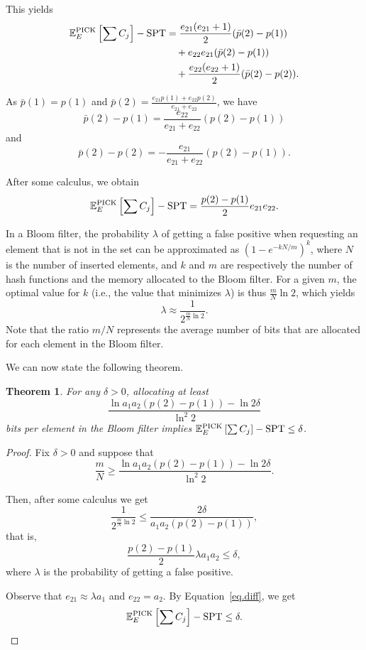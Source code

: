 \documentclass{article}
\newtheorem{theorem}{Theorem}
\begin{document}
This yields
\begin{align*}
    \mathbb{E}_E^{\text{PICK}}\left[\sum C_j\right]-\text{SPT}
    &=\frac{e_{21}(e_{21}+1)}{2}(\bar{p}(2)-p(1)) \\
    &\quad+e_{22}e_{21}(\bar{p}(2)-p(1)) \\
    &\quad+\frac{e_{22}(e_{22}+1)}{2}(\bar{p}(2)-p(2)).
\end{align*}

As \(\bar{p}(1)=p(1)\) and \(\bar{p}(2)=\frac{e_{21}p(1)+e_{22}p(2)}{e_{21}+e_{22}}\), we have
\[
    \bar{p}(2)-p(1)=\frac{e_{22}}{e_{21}+e_{22}}(p(2)-p(1))
\]
and
\[
    \bar{p}(2)-p(2)=-\frac{e_{21}}{e_{21}+e_{22}}(p(2)-p(1)).
\]

After some calculus, we obtain
\begin{equation}
    \label{eq.diff}
    \mathbb{E}_E^{\text{PICK}}\left[\sum C_j\right]-\text{SPT}=\frac{p(2)-p(1)}{2}e_{21}e_{22}.
\end{equation}

In a Bloom filter, the probability \(\lambda\) of getting a false positive when requesting an element that is not in the set can be approximated as \(\left(1-e^{-kN/m}\right)^k\), where \(N\) is the number of inserted elements, and \(k\) and \(m\) are respectively the number of hash functions and the memory allocated to the Bloom filter.
For a given \(m\), the optimal value for \(k\) (i.e., the value that minimizes \(\lambda\)) is thus \(\frac{m}{N}\ln 2\), which yields
\[
    \lambda\approx\frac{1}{2^{\frac{m}{N}\ln 2}}.
\]
Note that the ratio \(m/N\) represents the average number of bits that are allocated for each element in the Bloom filter.

We can now state the following theorem.

\begin{theorem}
    For any \(\delta>0\), allocating at least
    \[
        \frac{\ln a_1a_2(p(2)-p(1))-\ln 2\delta}{\ln^2 2}
    \]
    bits per element in the Bloom filter implies \(\mathbb{E}_E^{\text{PICK}}\left[\sum C_j\right]-\text{SPT}\le\delta\).
\end{theorem}
\begin{proof}
    Fix \(\delta>0\) and suppose that
    \[
        \frac{m}{N}\ge\frac{\ln a_1a_2(p(2)-p(1))-\ln 2\delta}{\ln^2 2}.
    \]

    Then, after some calculus we get
    \[
        \frac{1}{2^{\frac{m}{N}\ln 2}}\le\frac{2\delta}{a_1a_2(p(2)-p(1))},
    \]
    that is,
    \[
        \frac{p(2)-p(1)}{2}\lambda a_1a_2\le\delta,
    \]
    where \(\lambda\) is the probability of getting a false positive.

    Observe that \(e_{21}\approx\lambda a_1\) and \(e_{22}=a_2\).
    By Equation~\ref{eq.diff}, we get
    \[
        \mathbb{E}_E^{\text{PICK}}\left[\sum C_j\right]-\text{SPT}\le\delta.
    \]
\end{proof}
\end{document}
